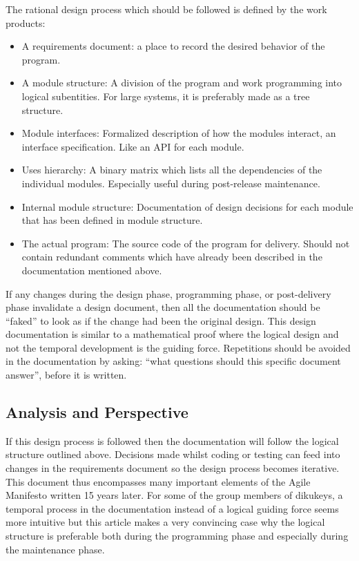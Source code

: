 \documentclass[11pt,a4paper]{report}
\begin{document}
The rational design process which should be followed is defined by the work products:
\begin{itemize}
\item A requirements document: a place to record the desired behavior of the program.
\item A module structure: A division of the program and work programming into logical subentities. For large systems, it is preferably made as a tree structure.
\item Module interfaces: Formalized description of how the modules interact, an interface specification. Like an API for each module.
\item Uses hierarchy: A binary matrix which lists all the dependencies of the individual modules. Especially useful during post-release maintenance.
\item Internal module structure: Documentation of design decisions for each module that has been defined in module structure.
\item The actual program: The source code of the program for delivery. Should not contain redundant comments which have already been described in the documentation mentioned above.
\end{itemize}
If any changes during the design phase, programming phase, or post-delivery phase invalidate a design document, then all the documentation should be ``faked'' to look as if the change had been the original design. This design documentation is similar to a mathematical proof where the logical design and not the temporal development is the guiding force. Repetitions should be avoided in the documentation by asking: ``what questions should this specific document answer'', before it is written.
\subsection{Analysis and Perspective}
If this design process is followed then the documentation will follow the logical structure outlined above. Decisions made whilst coding or testing can feed into changes in the requirements document so the design process becomes iterative. This document thus encompasses many important elements of the Agile Manifesto\cite{beck} written 15 years later. For some of the group members of dikukeys, a temporal process in the documentation instead of a logical guiding force seems more intuitive but this article makes a very convincing case why the logical structure is preferable both during the programming phase and especially during the maintenance phase.
\end{document}
